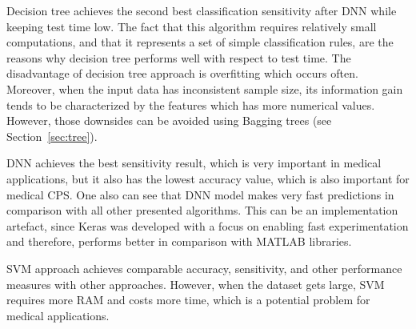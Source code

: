 Decision tree achieves the second best 
classification sensitivity after DNN while keeping test time low. 
The fact that this algorithm requires relatively small computations, 
and that it represents a set of simple classification rules, are the 
reasons why decision tree performs well with respect to test time. 
The disadvantage of decision tree approach is overfitting which 
occurs often. Moreover, when the input 
data has inconsistent sample size, its information gain tends to be 
characterized by the features which has more numerical values. 
However, those downsides can be avoided using Bagging trees (see 
Section~\ref{sec:tree}).

DNN achieves the best sensitivity result, which is very important in 
medical applications, but it also has the lowest accuracy value, 
which is also important for medical CPS.  
One also can see that DNN model makes very fast predictions in 
comparison with all other presented algorithms. This can be an 
implementation artefact, since Keras was developed with a focus on 
enabling fast experimentation and therefore, performs better in 
comparison with MATLAB libraries. 

SVM approach achieves comparable accuracy, sensitivity, and 
other performance 
measures with other approaches. 
However, when the dataset gets large, SVM requires more RAM 
and costs more time, which is a potential problem for medical 
applications. 



